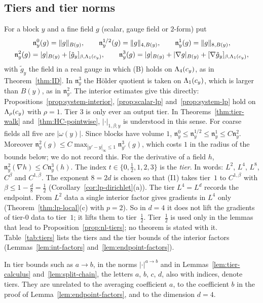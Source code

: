 \subsection{Tiers and tier norms}\label{ss:44.1}

For a block $y$ and a fine field $g$ (scalar, gauge field or $2$-form) put
\[
\begin{gathered}
\mathfrak n^0_y(g)=\|g\|_{B(y)},\qquad\mathfrak n^{1/2}_y(g)=\|g\|_{4,B(y)},\qquad\mathfrak n^1_y(g)=\|g\|_{8,B(y)},\\
\mathfrak n^2_y(g)=|g|_{B(y)}+[\tilde g_y]_{\beta,\Lambda_1(c_y)},\qquad\mathfrak n^3_y(g)=|g|_{B(y)}+|\nabla g|_{B(y)}+[\nabla\tilde g_y]_{\beta,\Lambda_1(c_y)},
\end{gathered}
\]
with $\tilde g_y$ the field in a real gauge in which (B) holds on $\Lambda_4(c_y)$, as in Theorem~\ref{thm:ID}. In $\mathfrak n^3_y$ the H\"older quotient is taken on $\Lambda_1(c_y)$, which is larger than $B(y)$, as in $\mathfrak n^2_y$. The interior estimates give this directly: Propositions~\ref{prop:system-interior}, \ref{prop:scalar-lp} and~\ref{prop:system-lp} hold on $\Lambda_\rho(c_y)$ with $\rho=1$. Tier $3$ is only ever an output tier. In Theorems~\ref{thm:tier-walk} and~\ref{thm:HC-pointwise}, $|\cdot|_{1,\beta;y}$ is understood in this sense. For coarse fields all five are $|\omega(y)|$. Since blocks have volume $1$, $\mathfrak n^0_y\le\mathfrak n^{1/2}_y\le\mathfrak n^1_y\le C\mathfrak n^2_y$. Moreover $\mathfrak n^2_y(g)\le C\max_{|y'-y|_\infty\le1}\mathfrak n^3_{y'}(g)$, which costs $1$ in the radius of the bounds below; we do not record this. For the derivative of a field $h$, $\mathfrak n^2_y(\nabla h)\le C\mathfrak n^3_y(h)$. The index $t\in\{0,\frac12,1,2,3\}$ is the \emph{tier}. In words: $L^2$, $L^4$, $L^8$, $C^\beta$ and $C^{1,\beta}$. The exponent $8=2d$ is chosen so that (I1) takes tier~$1$ to $C^{1,\beta}$ with $\beta\le1-\frac d8=\frac12$ (Corollary~\ref{cor:lp-dirichlet}(a)). The tier $L^4=L^d$ records the endpoint. From $L^2$ data a single interior factor gives gradients in $L^4$ only (Theorem~\ref{thm:lp-local}(c) with $p=2$). So in $d=4$ it does not lift the gradients of tier-$0$ data to tier~$1$; it lifts them to tier~$\frac12$. Tier~$\frac12$ is used only in the lemmas that lead to Proposition~\ref{prop:nl-tiers}; no theorem is stated with it. Table~\ref{tab:tiers} lists the tiers and the tier bounds of the interior factors (Lemmas~\ref{lem:int-factors} and~\ref{lem:endpoint-factors}).

In tier bounds such as $a\to b$, in the norms $|\cdot|^{a\to b}$ and in Lemmas~\ref{lem:tier-calculus} and~\ref{lem:split-chain}, the letters $a$, $b$, $c$, $d$, also with indices, denote tiers. They are unrelated to the averaging coefficient $a$, to the coefficient $b$ in the proof of Lemma~\ref{lem:endpoint-factors}, and to the dimension $d=4$.

